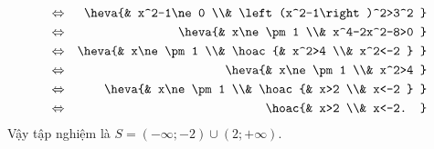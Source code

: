 \begin{bt}
{\begin{enumerate}
\begin{eqnarray*}
			&\Leftrightarrow&  \heva{& x^2-1\ne 0 \\& \left(x^2-1\right)^2>3^2 } \\
			&\Leftrightarrow& \heva{& x\ne \pm 1  \\& x^4-2x^2-8>0 } \\
			&\Leftrightarrow& \heva{& x\ne \pm 1 \\& \hoac{& x^2>4  \\& x^2<-2 } } \\
			&\Leftrightarrow& \heva{& x\ne \pm 1  \\& x^2>4 } \\
			&\Leftrightarrow&  \heva{& x\ne \pm 1 \\& \hoac{& x>2 \\& x<-2 } } \\
			&\Leftrightarrow& \hoac{& x>2 \\& x<-2. } 
		\end{eqnarray*}
		Vậy tập nghiệm là  $S=\left(-\infty;-2\right)\cup\left(2;+\infty\right)$.
	\end{enumerate}
	} 
\end{bt}

